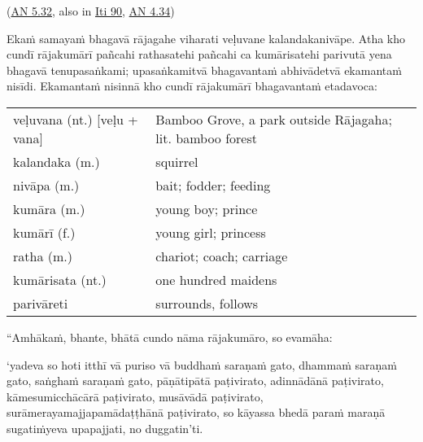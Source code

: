 \documentclass[11pt,oneside]{memoir}
\begin{document}
(\href{https://suttacentral.net/an5.32/en/sujato}{AN 5.32}, also in \href{https://suttacentral.net/iti90/en/thanissaro}{Iti 90}, \href{https://suttacentral.net/an4.34/en/sujato}{AN 4.34})

\begin{spacedquote}
Ekaṁ samayaṁ bhagavā rājagahe viharati veḷuvane kalandakanivāpe. Atha kho cundī
rājakumārī pañcahi rathasatehi pañcahi ca kumārisatehi parivutā yena bhagavā
tenupasaṅkami; upasaṅkamitvā bhagavantaṁ abhivādetvā ekamantaṁ nisīdi. Ekamantaṁ
nisinnā kho cundī rājakumārī bhagavantaṁ etadavoca:
\end{spacedquote}

\begin{longtable}{L{\colOne} L{\colTwo}}
veḷuvana (nt.) [veḷu + vana] & Bamboo Grove, a park outside Rājagaha; lit. bamboo forest\\[0pt]
kalandaka (m.) & squirrel\\[0pt]
nivāpa (m.) & bait; fodder; feeding\\[0pt]
kumāra (m.) & young boy; prince\\[0pt]
kumārī (f.) & young girl; princess\\[0pt]
ratha (m.) & chariot; coach; carriage\\[0pt]
kumārisata (nt.) & one hundred maidens\\[0pt]
parivāreti & surrounds, follows\\[0pt]
\end{longtable}

\begin{spacedquote}
“Amhākaṁ, bhante, bhātā cundo nāma rājakumāro, so evamāha:

‘yadeva so hoti itthī vā puriso vā
buddhaṁ saraṇaṁ gato, dhammaṁ saraṇaṁ gato, saṅghaṁ saraṇaṁ gato,
pāṇātipātā paṭivirato, adinnādānā paṭivirato, kāmesumicchācārā paṭivirato,
musāvādā paṭivirato, surāmerayamajjapamādaṭṭhānā paṭivirato,
so kāyassa bhedā paraṁ maraṇā sugatiṁyeva upapajjati, no duggatin’ti.
\end{spacedquote}

\enlargethispage{2\baselineskip}
\end{document}
